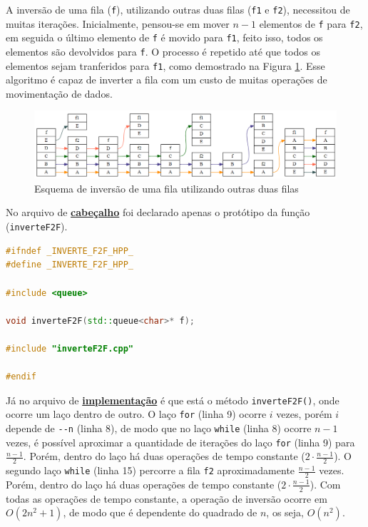 \documentclass[
  brazilian,
  paper=a4,
  oneside  ,captions=tableheading
]{scrbook}
\newcommand{\passthrough}[1]{#1}
\begin{document}
A inversão de uma fila (\passthrough{\lstinline!f!}), utilizando outras
duas filas (\passthrough{\lstinline!f1!} e
\passthrough{\lstinline!f2!}), necessitou de muitas iterações.
Inicialmente, pensou-se em mover \(n-1\) elementos de
\passthrough{\lstinline!f!} para \passthrough{\lstinline!f2!}, em
seguida o último elemento de \passthrough{\lstinline!f!} é movido para
\passthrough{\lstinline!f1!}, feito isso, todos os elementos são
devolvidos para \passthrough{\lstinline!f!}. O processo é repetido até
que todos os elementos sejam tranferidos para
\passthrough{\lstinline!f1!}, como demostrado na Figura \ref{Fig:2}.
Esse algoritmo é capaz de inverter a fila com um custo de muitas
operações de movimentação de dados.

\begin{figure}
\hypertarget{Fig:2}{%
\centering
\includegraphics{inverteF2F.png}
\caption{Esquema de inversão de uma fila utilizando outras duas
filas}\label{Fig:2}
}
\end{figure}

No arquivo de
\href{https://github.com/ecostadelle/lista_pilhas_filas/blob/main/include/inverteF2F.hpp}{\textbf{cabeçalho}}
foi declarado apenas o protótipo da função
(\passthrough{\lstinline!inverteF2F!}).

\begin{lstlisting}[language={C++}]
#ifndef _INVERTE_F2F_HPP_
#define _INVERTE_F2F_HPP_

#include <queue>

void inverteF2F(std::queue<char>* f);

#include "inverteF2F.cpp"

#endif  
\end{lstlisting}

Já no arquivo de
\href{https://github.com/ecostadelle/lista_pilhas_filas/blob/main/include/inverteF2F.cpp}{\textbf{implementação}}
é que está o método \passthrough{\lstinline!inverteF2F()!}, onde ocorre
um laço dentro de outro. O laço \passthrough{\lstinline!for!} (linha 9)
ocorre \(i\) vezes, porém \(i\) depende de \passthrough{\lstinline!--n!}
(linha 8), de modo que no laço \passthrough{\lstinline!while!} (linha 8)
ocorre \(n-1\) vezes, é possível aproximar a quantidade de iterações do
laço \passthrough{\lstinline!for!} (linha 9) para \(\frac{n-1}{2}\).
Porém, dentro do laço há duas operações de tempo constante
(\(2 \cdot \frac{n-1}{2}\)). O segundo laço
\passthrough{\lstinline!while!} (linha 15) percorre a fila
\passthrough{\lstinline!f2!} aproximadamente \(\frac{n-1}{2}\) vezes.
Porém, dentro do laço há duas operações de tempo constante
(\(2 \cdot \frac{n-1}{2}\)). Com todas as operações de tempo constante,
a operação de inversão ocorre em \(O(2n^2 +1)\), de modo que é
dependente do quadrado de \(n\), os seja, \(O(n^2)\).
\end{document}
